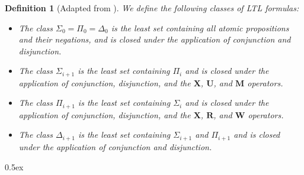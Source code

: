 \documentclass[11pt,a4paper]{article}
\newcommand{\X}{{\ensuremath{\mathbf{X}}}}
\newcommand{\U}{{\ensuremath{\mathbf{U}}}}
\newcommand{\W}{{\ensuremath{\mathbf{W}}}}
\newcommand{\M}{{\ensuremath{\mathbf{M}}}}
\newcommand{\R}{{\ensuremath{\mathbf{R}}}}
\newtheorem{definition}[theorem]{Definition}
\begin{document}
\begin{definition}[Adapted from \cite{DBLP:conf/mfcs/CernaP03}]
\label{def:future_hierarchy}
We define the following classes of LTL formulas:
\begin{itemize}
	\item The class $\Sigma_0 = \Pi_0 = \Delta_0$ is the least set containing all atomic propositions and their negations, and is closed under the application of conjunction and disjunction.
	\item The class $\Sigma_{i+1}$ is the least set containing $\Pi_i$ and is closed under the application of conjunction, disjunction, and the $\X$, $\U$, and $\M$ operators.
	\item The class $\Pi_{i+1}$ is the least set containing $\Sigma_i$ and is closed under the application of conjunction, disjunction, and the $\X$, $\R$, and $\W$ operators.
	\item The class $\Delta_{i+1}$ is the least set containing $\Sigma_{i+1}$ and $\Pi_{i+1}$ and is closed under the application of conjunction and disjunction.
\end{itemize}
\end{definition}

\parindent 0pt\parskip 0.5ex





\end{document}
